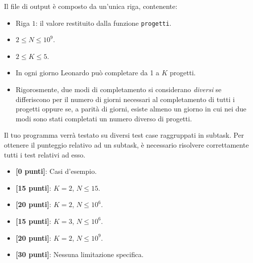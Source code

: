 Il file di output è composto da un'unica riga, contenente:
\begin{itemize}[nolistsep,itemsep=2mm]
    \item Riga $1$: il valore restituito dalla funzione \texttt{progetti}.
\end{itemize}


\Constraints

\begin{itemize}[nolistsep, itemsep=2mm]
\item $2 \le N \le 10^9$.
\item $2 \le K \le 5$.
\item In ogni giorno Leonardo può completare da 1 a $K$ progetti.
\item Rigorosmente, due modi di completamento si considerano \emph{diversi} se differiscono per il numero di giorni necessari al completamento di tutti i progetti oppure se, a parità di giorni, esiste almeno un giorno in cui nei due modi sono stati completati un numero diverso di progetti. 
\end{itemize}

\Scoring
Il tuo programma verrà testato su diversi test case raggruppati in subtask.
Per ottenere il punteggio relativo ad un subtask, è necessario risolvere
correttamente tutti i test relativi ad esso.
\begin{itemize}[nolistsep,itemsep=2mm]
\item \textbf{ [\phantom{0}0 punti]}: Casi d'esempio.
\item \textbf{ [15 punti]}: $K = 2$, $N \le 15$.
\item \textbf{ [20 punti]}: $K = 2$, $N \le 10^6$.
\item \textbf{ [15 punti]}: $K = 3$, $N \le 10^6$.
\item \textbf{ [20 punti]}: $K = 2$, $N \le 10^9$.
\item \textbf{ [30 punti]}: Nessuna limitazione specifica.
\end{itemize}

\pagebreak

\Examples
\begin{example}
%
%
\end{example}


